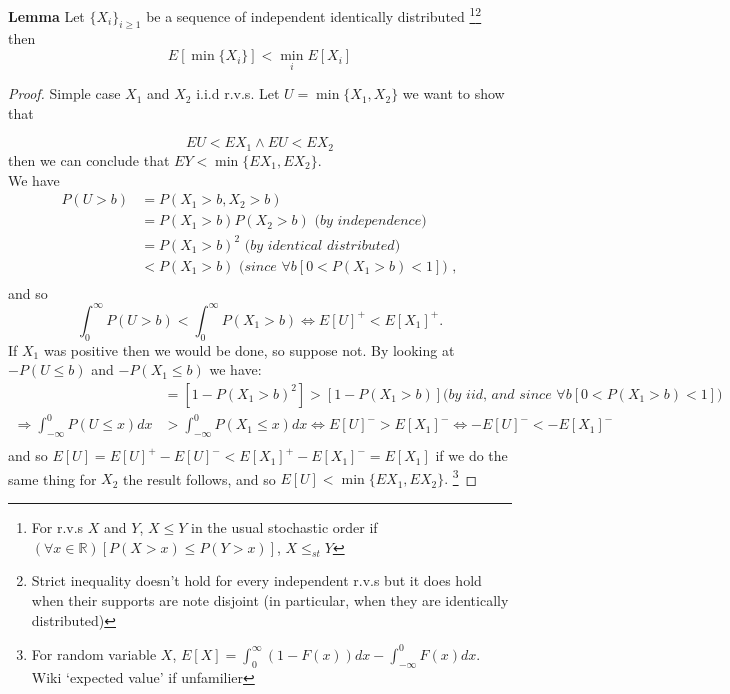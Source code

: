 \documentclass[11pt]{article}
\theoremstyle{quest}
\newcommand{\R}{\mathbb{R}}
\begin{document}
\begin{tcolorbox}
\textbf{Lemma} Let $\{X_i\}_{i\ge1} $ be a sequence of independent identically distributed \footnote{For r.v.s $X$ and $Y$, $X\le Y$ in the usual stochastic order if $(\forall x\in \R) [P(X>x)\le P(Y>x)]$, $X\le_{st} Y$}\footnote{Strict inequality doesn't hold for every independent r.v.s but it does hold when their supports are note disjoint (in particular, when they are identically distributed)} then $$E[\min\{X_i\}]< \min_i{E[X_i]}$$ 
\end{tcolorbox}
\begin{proof}
Simple case $X_1$ and $X_2$ i.i.d r.v.s. Let $U=\min\{X_1,X_2\}$  we want to show that 

$$EU<EX_1 \land EU<EX_2$$ then we can conclude that $EY<\min\{EX_1,EX_2\}$. \\We have
\begin{align*}
P(U>b)&=P(X_1>b,X_2>b)\\
&=P(X_1>b)P(X_2>b) \textit{ (by independence)}\\
&=P(X_1>b)^2 \textit{ (by identical distributed) } \\
&<P(X_1>b) \textit{ (since  $\forall b[0<P(X_1>b)< 1]$) },\\
\end{align*} 
and so
$$\int_{0}^\infty P(U>b)<\int_{0}^\infty P(X_1>b) \iff E[U]^+<E[X_1]^+.$$  If $X_1$ was positive then we would be done, so suppose not. By looking at $-P(U\le b)$ and $-P(X_1\le b)$ we have:
\begin{align*}
[1-P(U>b)]&=[1-P(X_1>b)^2]>[1-P(X_1>b)]  \textit{(by iid, and since  $\forall b[0<P(X_1>b)< 1]$) }\\
\Rightarrow \int_{-\infty}^0 P(U\le x)dx &> \int_{-\infty}^0 P(X_1\le x)dx \iff E[U]^->E[X_1]^- \iff -E[U]^-<-E[X_1]^- \\
\end{align*} and so $E[U]= E[U]^{+}-E[U]^-<E[X_1]^{+}-E[X_1]^-=E[X_1]$ if we do the same thing for $X_2$ the result follows, and so $E[U]< \min\{EX_1,EX_2\}.$%
%
\footnote{For random variable $X$, $E[X]=\int_0^\infty (1-F(x))dx - \int_{-\infty}^0 F(x)dx$. Wiki `expected value' if unfamilier}
\end{proof}
\end{document}
